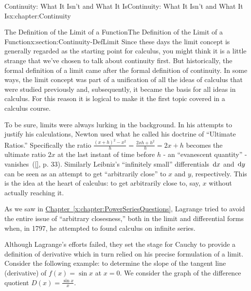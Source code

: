 \begin{chapterptx}{Continuity: What It Isn't and What It Is}{}{Continuity: What It Isn't and What It Is}{}{}{x:chapter:Continuity}
	\typeout{************************************************}
	\begin{sectionptx}{The Definition of the Limit of a Function}{}{The Definition of the Limit of a Function}{}{}{x:section:Continuity-DefLimit}
		Since these days the limit concept is generally regarded as the starting point for calculus, you might think it is a little strange that we've chosen to talk about continuity first. But historically, the formal definition of a limit came after the formal definition of continuity. In some ways, the limit concept was part of a unification of all the ideas of calculus that were studied previously and, subsequently, it became the basis for all ideas in calculus. For this reason it is logical to make it the first topic covered in a calculus course.%
		\par
		To be sure, limits were always lurking in the background. In his attempts to justify his calculations, Newton  used what he called his doctrine of ``Ultimate Ratios.'' Specifically the ratio \(\frac{(x+h)^2-x^2}{h} = \frac{2xh+h^2}{h} = 2x+h\) becomes the ultimate ratio \(2x\) at the last instant of time before \(h\) - an ``evanescent quantity'' - vanishes~(\hyperlink{x:biblio:grabiner81__origin_cauch_rigor_calculy}{[{}]}, p. 33). Similarly Leibniz's ``infinitely small'' differentials \(\,{\rm d} x\) and \(\,{\rm d} y\) can be seen as an attempt to get ``arbitrarily close'' to \(x\) and \(y\), respectively. This is the idea at the heart of calculus: to get arbitrarily close to, say, \(x\) without actually reaching it.%
		\par
		As we saw in \hyperref[x:chapter:PowerSeriesQuestions]{Chapter~{\xreffont\ref{x:chapter:PowerSeriesQuestions}}}, Lagrange  tried to avoid the entire issue of ``arbitrary closesness,'' both in the limit and differential forms when, in 1797, he attempted to found calculus on infinite series.%
		\par
		Although Lagrange's  efforts failed, they set the stage for Cauchy  to provide a definition of derivative which in turn relied on his precise formulation of a limit. Consider the following example: to determine the slope of the tangent line (derivative) of \(f(x) = \sin x\) at \(x=0\). We consider the graph of the difference quotient \(D(x) =\frac{\sin x }{x}\).%
		\begin{image}{0.22}{0.56}{0.22}%

\end{image}
\end{sectionptx}
\end{chapterptx}
